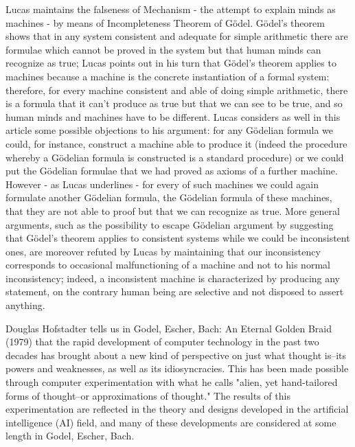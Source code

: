 \documentclass[12pt, specialist, subf, substylefile = spbu.rtx]{disser}
\begin{document}
Lucas maintains the falseness of Mechanism - the attempt to explain minds as machines - by means of Incompleteness Theorem of Gödel. Gödel’s theorem shows that in any system consistent and adequate for simple arithmetic there are formulae which cannot be proved in the system but that human minds can recognize as true; Lucas points out in his turn that Gödel’s theorem applies to machines because a machine is the concrete instantiation of a formal system: therefore, for every machine consistent and able of doing simple arithmetic, there is a formula that it can’t produce as true but that we can see to be true, and so human minds and machines have to be different. Lucas considers as well in this article some possible objections to his argument: for any Gödelian formula we could, for instance, construct a machine able to produce it (indeed the procedure whereby a Gödelian formula is constructed is a standard procedure) or we could put the Gödelian formulae that we had proved as axioms of a further machine. However - as Lucas underlines - for every of such machines we could again formulate another Gödelian formula, the Gödelian formula of these machines, that they are not able to proof but that we can recognize as true. More general arguments, such as the possibility to escape Gödelian argument by suggesting that Gödel’s theorem applies to consistent systems while we could be inconsistent ones, are moreover refuted by Lucas by maintaining that our inconsistency corresponds to occasional malfunctioning of a machine and not to his normal inconsistency; indeed, a inconsistent machine is characterized by producing any statement, on the contrary human being are selective and not disposed to assert anything.

Douglas Hofstadter tells us in Godel, Escher, Bach: An Eternal Golden Braid (1979) that the rapid development of computer technology in the past two decades has brought about a new kind of perspective on just what thought is--its powers and weaknesses, as well as its idiosyncracies. This has been made possible through computer experimentation with what he calls "alien, yet hand-tailored forms of thought--or approximations of thought." The results of this experimentation are reflected in the theory and designs developed in the artificial intelligence (AI) field, and many of these developments are considered at some length in Godel, Escher, Bach.
\end{document}

